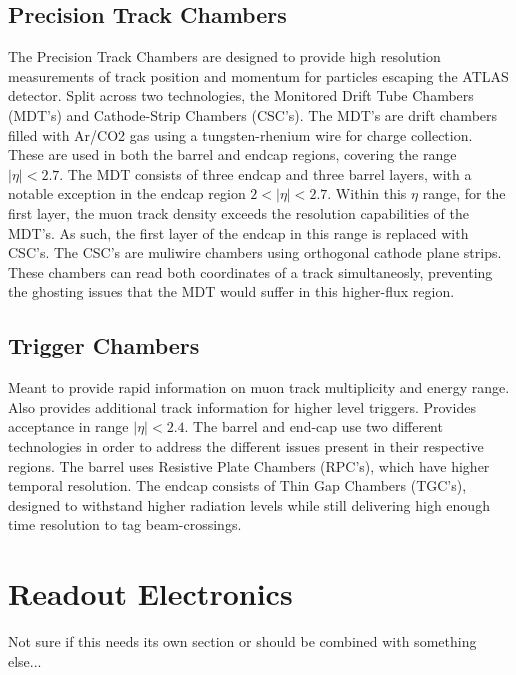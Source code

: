     \subsection{Precision Track Chambers}
        The Precision Track Chambers are designed to provide high resolution measurements of track position and momentum for particles escaping the ATLAS detector. Split across two technologies, the Monitored Drift Tube Chambers (MDT's) and Cathode-Strip Chambers (CSC's).
        The MDT's are drift chambers filled with Ar/CO2 gas using a tungsten-rhenium wire for charge collection. These are used in both the barrel and endcap regions, covering the range $|\eta| < 2.7$. The MDT consists of three endcap and three barrel layers, with a notable exception in the endcap region $2 < |\eta| < 2.7$. Within this $\eta$ range, for the first layer, the muon track density exceeds the resolution capabilities of the MDT's. As such, the first layer of the endcap in this range is replaced with CSC's. The CSC's are muliwire chambers using orthogonal cathode plane strips. These chambers can read both coordinates of a track simultaneosly, preventing the ghosting issues that the MDT would suffer in this higher-flux region.

    \subsection{Trigger Chambers}
        Meant to provide rapid information on muon track multiplicity and energy range.
        Also provides additional track information for higher level triggers.
        Provides acceptance in range $|\eta| < 2.4$.
        The barrel and end-cap use two different technologies in order to address the different issues present in their respective regions.
        The barrel uses Resistive Plate Chambers (RPC's), which have higher temporal resolution. The endcap consists of Thin Gap Chambers (TGC's), designed to withstand higher radiation levels while still delivering high enough time resolution to tag beam-crossings.




\section{Readout Electronics} %
    Not sure if this needs its own section or should be combined with something else...
